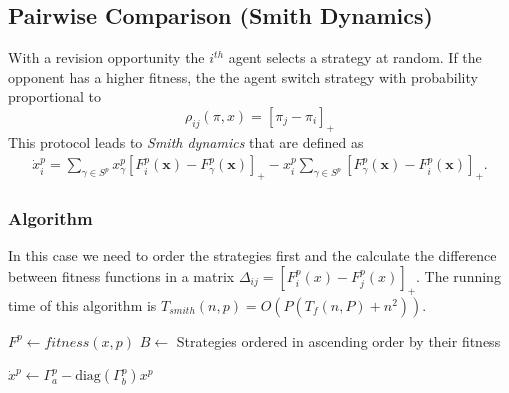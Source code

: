 \documentclass[a4paper,10pt]{article}
\def\th{^{th}}
\newcommand{\bs}[1]{\boldsymbol{#1}}
\def\th{^{th}}
\begin{document}
\subsection{Pairwise Comparison (Smith Dynamics)}

With a revision opportunity the $i\th$ agent selects a strategy at random. If the opponent has a higher fitness, the the agent switch strategy with probability proportional to
\begin{equation}
\rho_{ij}(\pi, x) = \left[ \pi_j - \pi_i \right]_+
\end{equation}
This protocol leads to \emph{Smith dynamics} that are defined as 
%
\begin{multline} 
\dot{x}_i^p  = \sum_{\gamma \in S^p} x_\gamma^p  \left[ F_i^p \left( \bs{x} \right) - F_\gamma^p \left( \bs{x} \right) \right]_+ 
- x_i^p  \sum_{\gamma \in S^p} \left[ F_\gamma^p ( \bs{x}) - F_i^p( \bs{x} ) \right]_+.
\label{eq:smith}
\end{multline}


\subsubsection*{Algorithm}

In this case we need to order the strategies first and the calculate the difference between fitness functions in a matrix $\Delta_{ij} = [F_i^p(x) - F_j^p(x)]_+$. The running time of this algorithm is $T_{smith}(n,p) = O(P(T_f(n, P)+n^2 ))$.


\begin{algorithm}[H]

 \BlankLine
  {
  $ F^p \leftarrow fitness(x, p)$\;
  $B \leftarrow$ Strategies ordered in ascending order by their fitness  \;
  
  $ \dot{x}^p \leftarrow \Gamma_a^p - \text{diag}(\Gamma_b^p) x^p $\;
 }
\end{algorithm}
\end{document}
